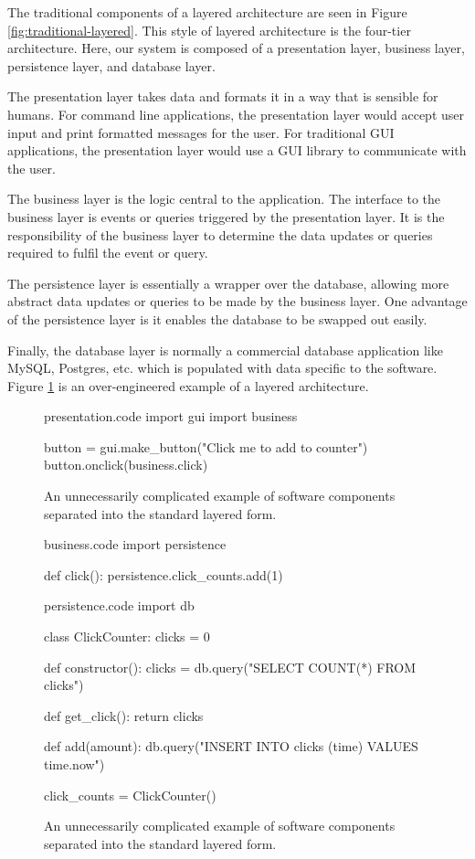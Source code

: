 The traditional components of a layered architecture are seen in Figure \ref{fig:traditional-layered}.
This style of layered architecture is the four-tier architecture.
Here, our system is composed of a presentation layer, business layer, persistence layer, and database layer.

The presentation layer takes data and formats it in a way that is sensible for humans.
For command line applications, the presentation layer would accept user input and print formatted messages for the user.
For traditional GUI applications, the presentation layer would use a GUI library to communicate with the user.

The business layer is the logic central to the application.
The interface to the business layer is events or queries triggered by the presentation layer.
It is the responsibility of the business layer to determine the data updates or queries required to fulfil the event or query.

The persistence layer is essentially a wrapper over the database,
allowing more abstract data updates or queries to be made by the business layer.
One advantage of the persistence layer is it enables the database to be swapped out easily.

Finally, the database layer is normally a commercial database application like MySQL, Postgres, etc.
which is populated with data specific to the software.
Figure \ref{fig:standard-form-example} is an over-engineered example of a layered architecture.

\begin{figure}[H]
\begin{code}[style=python]{presentation.code}
import gui
import business

button = gui.make_button("Click me to add to counter")
button.onclick(business.click)
\end{code}
\caption{An unnecessarily complicated example of software components separated into the standard layered form.}
\label{fig:standard-form-example}
\end{figure}

\begin{figure}[H]
\ContinuedFloat
\begin{code}[style=python]{business.code}
import persistence

def click():
    persistence.click_counts.add(1)
\end{code}

\begin{code}[style=python]{persistence.code}
import db

class ClickCounter:
    clicks = 0

    def constructor():
        clicks = db.query("SELECT COUNT(*) FROM clicks")

    def get_click():
        return clicks

    def add(amount):
        db.query("INSERT INTO clicks (time) VALUES {{time.now}}")

click_counts = ClickCounter()
\end{code}
\caption{An unnecessarily complicated example of software components separated into the standard layered form.}
\end{figure}

